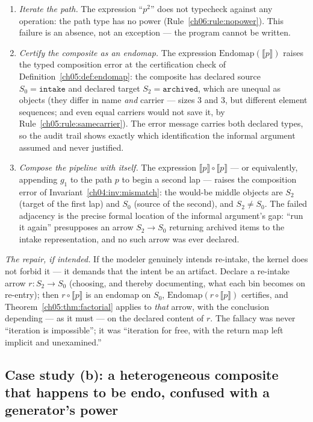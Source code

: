 \begin{enumerate}
\item \emph{Iterate the path.} The expression ``$p^{2}$'' does not
typecheck against any operation: the path type has no power
(Rule~\ref{ch06:rule:nopower}). This failure is an absence, not an
exception --- the program cannot be written.
\item \emph{Certify the composite as an endomap.} The expression
$\mathrm{Endomap}(\llbracket p \rrbracket)$ raises the typed composition
error at the certification check of Definition~\ref{ch05:def:endomap}:
the composite has declared source $S_0 = \texttt{intake}$ and declared
target $S_2 = \texttt{archived}$, which are unequal as objects (they differ
in name \emph{and} carrier --- sizes $3$ and $3$, but different element
sequences; and even equal carriers would not save it, by
Rule~\ref{ch05:rule:samecarrier}). The error message carries both declared
types, so the audit trail shows exactly which identification the informal
argument assumed and never justified.
\item \emph{Compose the pipeline with itself.} The expression
$\llbracket p \rrbracket \circ \llbracket p \rrbracket$ --- or
equivalently, appending $g_1$ to the path $p$ to begin a second lap ---
raises the composition error of Invariant~\ref{ch04:inv:mismatch}: the
would-be middle objects are $S_2$ (target of the first lap) and $S_0$
(source of the second), and $S_2 \ne S_0$. The failed adjacency is the
precise formal location of the informal argument's gap: ``run it again''
presupposes an arrow $S_2 \to S_0$ returning archived items to the intake
representation, and no such arrow was ever declared.
\end{enumerate}

\emph{The repair, if intended.} If the modeler genuinely intends re-intake,
the kernel does not forbid it --- it demands that the intent be an artifact.
Declare a re-intake arrow $r : S_2 \to S_0$ (choosing, and thereby
documenting, what each bin becomes on re-entry); then
$r \circ \llbracket p \rrbracket$ is an endomap on $S_0$,
$\mathrm{Endomap}(r \circ \llbracket p \rrbracket)$ certifies, and
Theorem~\ref{ch05:thm:factorial} applies to \emph{that} arrow, with the
conclusion depending --- as it must --- on the declared content of $r$.
The fallacy was never ``iteration is impossible''; it was ``iteration for
free, with the return map left implicit and unexamined.''

\subsection{Case study (b): a heterogeneous composite that happens to be
endo, confused with a generator's power}
\label{ch06:sec:case-b}

